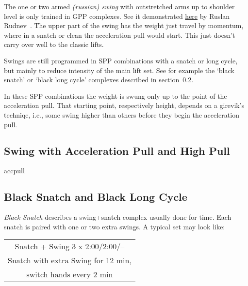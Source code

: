 \documentclass[a4paper,11pt,oneside]{article}
\begin{document}
The one or two armed \emph{(russian) swing} with outstretched arms up to shoulder 
level is only trained in GPP complexes. See it demonstrated 
\href{https://youtu.be/T2Sx7qi1TcQ?t=167}{here} by Ruslan Rudnev~\cite{rkbyten_swings}. 
The upper part of the swing has the weight just travel by momentum, where in a 
snatch  or clean the acceleration pull would start. This just doesn't carry over 
well to the classic lifts. 

Swings are still programmed in SPP combinations with a snatch or long cycle, but 
mainly to reduce intensity of the main lift set. See for example the `black snatch' 
or `black long cycle' complexes described in section~\ref{blacksnatchlc}.

In these SPP combinations the weight is swung only up to the point of the acceleration 
pull. That starting point, respectively height, depends on a girevik's techniqe, i.e., 
some swing higher than others before they begin the acceleration pull.


\subsection{Swing with Acceleration Pull and High Pull}

\href{https://youtu.be/T2Sx7qi1TcQ?t=369}{accpull}


\subsection{Black Snatch and Black Long Cycle}
\label{blacksnatchlc}

\emph{Black Snatch} describes a swing+snatch complex usually done for time. Each 
snatch is paired with one or two extra swings. A typical set may look like:

\begin{center}
\begin{tabular}{c}
\hline
Snatch + Swing 3 x 2:00/2:00/-- \\
Snatch with extra Swing for 12 min, \\
switch hands every 2 min \\
\hline
\end{tabular}
\end{center}
\end{document}
